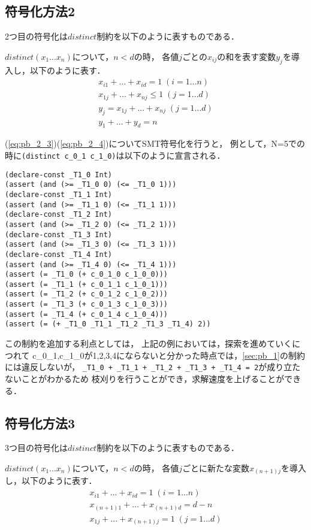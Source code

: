 \subsection{符号化方法2}
2つ目の符号化は$distinct$制約を以下のように表すものである．

$distinct(x_1 ... x_n)$について，$n < d$の時，
各値$j$ごとの$x_{ij}$の和を表す変数$y_j$を導入し，以下のように表す．
\begin{eqnarray}
    x_{i1} + ... + x_{id}=1 \; (i=1 ... n) \label{eq:pb_2_1}\\
    x_{1j} + ... + x_{nj}\leq1 \; (j=1 ... d) \label{eq:pb_2_2}\\
    y_j = x_{1j} + ... + x_{nj} \; (j=1 ... d) \label{eq:pb_2_3}\\
    y_1 + ... + y_d =n \label{eq:pb_2_4}
\end{eqnarray}

(\ref{eq:pb_2_3})(\ref{eq:pb_2_4})についてSMT符号化を行うと，
例として，N=5での時に\verb|(distinct c_0_1 c_1_0)|は以下のように宣言される．

\begin{verbatim}
(declare-const _T1_0 Int)
(assert (and (>= _T1_0 0) (<= _T1_0 1)))
(declare-const _T1_1 Int)
(assert (and (>= _T1_1 0) (<= _T1_1 1)))
(declare-const _T1_2 Int)
(assert (and (>= _T1_2 0) (<= _T1_2 1)))
(declare-const _T1_3 Int)
(assert (and (>= _T1_3 0) (<= _T1_3 1)))
(declare-const _T1_4 Int)
(assert (and (>= _T1_4 0) (<= _T1_4 1)))
(assert (= _T1_0 (+ c_0_1_0 c_1_0_0)))
(assert (= _T1_1 (+ c_0_1_1 c_1_0_1)))
(assert (= _T1_2 (+ c_0_1_2 c_1_0_2)))
(assert (= _T1_3 (+ c_0_1_3 c_1_0_3)))
(assert (= _T1_4 (+ c_0_1_4 c_1_0_4)))
(assert (= (+ _T1_0 _T1_1 _T1_2 _T1_3 _T1_4) 2))
\end{verbatim}

この制約を追加する利点としては，
上記の例においては，探索を進めていくにつれて
c\_0\_1,c\_1\_0が1,2,3,4にならないと分かった時点では，\ref{sec:pb_1}の制約には違反しないが，
\verb|_T1_0 + _T1_1 + _T1_2 + _T1_3 + _T1_4 = 2|が成り立たないことがわかるため
枝刈りを行うことができ，求解速度を上げることができる．

\subsection{符号化方法3}
3つ目の符号化は$distinct$制約を以下のように表すものである．

$distinct(x_1 ... x_n)$について，$n < d$の時，
各値$j$ごとに新たな変数$x_{(n+1)j}$を導入し，以下のように表す．
\begin{eqnarray}
    x_{i1} + ... + x_{id}=1 \; (i=1 ... n) \label{eq:pb_3_1}\\
    x_{(n+1)1} + ... + x_{(n+1)d}=d-n \label{eq:pb_3_2}\\
    x_{1j} + ... + x_{(n+1)j}=1 \; (j=1 ... d) \label{eq:pb_3_3}\\
\end{eqnarray}

